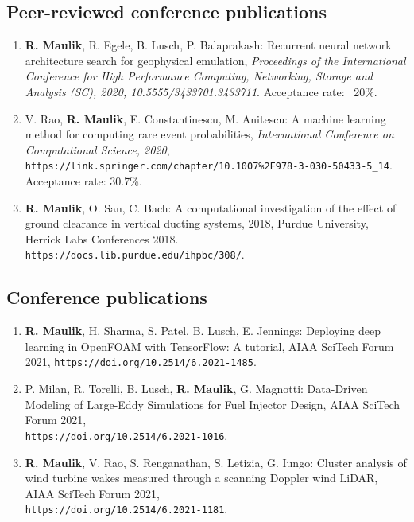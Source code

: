 \documentclass[letterpaper]{article}
\begin{document}
\subsection*{Peer-reviewed conference publications}

\begin{enumerate}

\item \textbf{R. Maulik}, R. Egele, B. Lusch,  P. Balaprakash: Recurrent neural network architecture search for geophysical emulation, {\it Proceedings of the International Conference for High Performance Computing, Networking, Storage and Analysis (SC), 2020, 10.5555/3433701.3433711}. Acceptance rate: ~20\%.

\item V. Rao, \textbf{R. Maulik}, E. Constantinescu, M. Anitescu: A machine learning method for computing rare event probabilities, {\it International Conference on Computational Science, 2020}, \\ \texttt{https://link.springer.com/chapter/10.1007\%2F978-3-030-50433-5\_14}. Acceptance rate: 30.7\%.

\item \textbf{R. Maulik}, O. San, C. Bach: A computational investigation of the effect of ground clearance in vertical ducting systems, 2018, Purdue University, Herrick Labs Conferences 2018. \\ \texttt{https://docs.lib.purdue.edu/ihpbc/308/}.

\end{enumerate}

\subsection*{Conference publications}

\begin{enumerate}

\item \textbf{R. Maulik}, H. Sharma, S. Patel, B. Lusch, E. Jennings: Deploying deep learning in OpenFOAM with TensorFlow: A tutorial, AIAA SciTech Forum 2021, \texttt{https://doi.org/10.2514/6.2021-1485}.

\item P. Milan, R. Torelli, B. Lusch, \textbf{R. Maulik}, G. Magnotti: Data-Driven Modeling of Large-Eddy Simulations for Fuel Injector Design, AIAA SciTech Forum 2021, \\ \texttt{https://doi.org/10.2514/6.2021-1016}.

\item \textbf{R. Maulik}, V. Rao, S. Renganathan, S. Letizia, G. Iungo: Cluster analysis of wind turbine wakes measured through a scanning Doppler wind LiDAR, AIAA SciTech Forum 2021, \\ \texttt{https://doi.org/10.2514/6.2021-1181}.

\end{enumerate}
\end{document}

